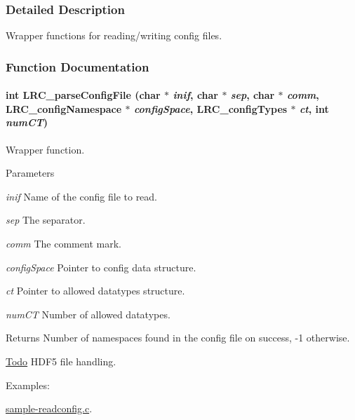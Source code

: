 \subsubsection{Detailed Description}
Wrapper functions for reading/writing config files. 

\subsubsection{Function Documentation}
\hypertarget{group___l_r_c__wrappers_ga98adf1a77ae325830d4521b691ca33b0}{
\paragraph[{LRC\_\-parseConfigFile}]{\setlength{\rightskip}{0pt plus 5cm}int LRC\_\-parseConfigFile (char $\ast$ {\em inif}, \/  char $\ast$ {\em sep}, \/  char $\ast$ {\em comm}, \/  {\bf LRC\_\-configNamespace} $\ast$ {\em configSpace}, \/  {\bf LRC\_\-configTypes} $\ast$ {\em ct}, \/  int {\em numCT})}\hfill}
\label{group___l_r_c__wrappers_ga98adf1a77ae325830d4521b691ca33b0}


Wrapper function. 
\begin{DoxyParams}{Parameters}
\item[{\em inif}]Name of the config file to read.\item[{\em sep}]The separator.\item[{\em comm}]The comment mark.\item[{\em configSpace}]Pointer to config data structure.\item[{\em ct}]Pointer to allowed datatypes structure.\item[{\em numCT}]Number of allowed datatypes.\end{DoxyParams}
\begin{DoxyReturn}{Returns}
Number of namespaces found in the config file on success, -\/1 otherwise.
\end{DoxyReturn}
\begin{Desc}
\item[\hyperlink{todo__todo000008}{Todo}]HDF5 file handling. \end{Desc}
\begin{Desc}
\item[Examples: ]\par
\hyperlink{sample-readconfig_8c-example}{sample-\/readconfig.c}.\end{Desc}


